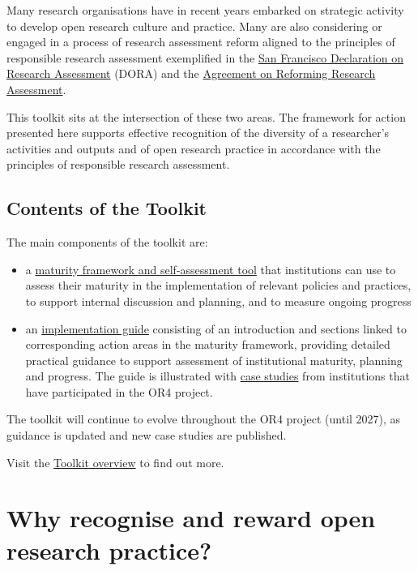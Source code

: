 \documentclass[
  letterpaper,
  DIV=11,
  numbers=noendperiod,
  oneside]{scrreprt}
\begin{document}
Many research organisations have in recent years embarked on strategic
activity to develop open research culture and practice. Many are also
considering or engaged in a process of research assessment reform
aligned to the principles of responsible research assessment exemplified
in the \href{https://sfdora.org/read/}{San Francisco Declaration on
Research Assessment} (DORA) and the
\href{https://coara.eu/agreement/the-agreement-full-text/}{Agreement on
Reforming Research Assessment}.

This toolkit sits at the intersection of these two areas. The framework
for action presented here supports effective recognition of the
diversity of a researcher's activities and outputs and of open research
practice in accordance with the principles of responsible research
assessment.

\section{Contents of the Toolkit}\label{contents-of-the-toolkit}

The main components of the toolkit are:

\begin{itemize}
\item
  a \href{maturity-framework.qmd}{maturity framework and self-assessment
  tool} that institutions can use to assess their maturity in the
  implementation of relevant policies and practices, to support internal
  discussion and planning, and to measure ongoing progress
\item
  an \href{guide-contents.qmd}{implementation guide} consisting of an
  introduction and sections linked to corresponding action areas in the
  maturity framework, providing detailed practical guidance to support
  assessment of institutional maturity, planning and progress. The guide
  is illustrated with \href{case-studies.qmd}{case studies} from
  institutions that have participated in the OR4 project.
\end{itemize}

The toolkit will continue to evolve throughout the OR4 project (until
2027), as guidance is updated and new case studies are published.

Visit the \href{overview.qmd}{Toolkit overview} to find out more.


\chapter{Why recognise and reward open research
practice?}\label{why-recognise-and-reward-open-research-practice}
\end{document}
